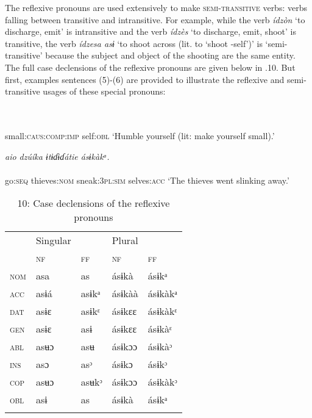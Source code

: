 The reflexive pronouns are used extensively to make \textsc{semi-transitive} verbs: verbs falling between transitive and intransitive. For example, while the verb \textit{ídzòn} ‘to discharge, emit’ is intransitive and the verb \textit{ídzès} ‘to discharge, emit, shoot’ is transitive, the verb \textit{ídzesa asɨ} ‘to shoot across (lit. to ‘shoot -self’)’ is ‘semi-transitive’ because the subject and object of the shooting are the same entity. The full case declensions of the reflexive pronouns are given below in .10. But first, examples sentences (5)-(6) are provided to illustrate the reflexive and semi-transitive usages of these special pronouns:




\ea\label{ex:}
 \\
    \\
small:\textsc{caus:comp:imp}   self:\textsc{obl}
\glt ‘Humble yourself (lit: make yourself small).’ 
\z




\ea\label{ex:}
\textit{aio     dzúíka   ɨtɨɗɨɗátie     ásɨkàkᵃ.} \\
    \\
go:\textsc{seq}   thieves:\textsc{nom}   sneak:\textsc{3pl:sim} selves:\textsc{acc}
\glt ‘The thieves went slinking away.’ 
\z



\begin{table}
\caption{10: Case declensions of the reflexive pronouns}
\label{tab:5}


\begin{tabularx}{\textwidth}{XXXXX} & Singular &  & Plural & \\
\lsptoprule
& \textsc{nf} & \textsc{ff} & \textsc{nf} & \textsc{ff}\\
\textsc{nom} & asa & as & ásɨkà & ásɨkᵃ\\
\textsc{acc} & asɨá & asɨkᵃ & ásɨkàà & ásɨkàkᵃ\\
\textsc{dat} & asɨɛ & asɨkᵋ & ásɨkɛɛ & ásɨkàkᵋ\\
\textsc{gen} & asɨɛ & asɨ & ásɨkɛɛ & ásɨkàᵋ\\
\textsc{abl} & asʉɔ & asʉ & ásɨkɔɔ & ásɨkàᵓ\\
\textsc{ins} & asɔ & asᵓ & ásɨkɔ & ásɨkᵓ\\
\textsc{cop} & asʉɔ & asʉkᵓ & ásɨkɔɔ & ásɨkàkᵓ\\
\textsc{obl} & asɨ & as & ásɨkà & ásɨkᵃ\\
\lspbottomrule
\end{tabularx}
\end{table}


